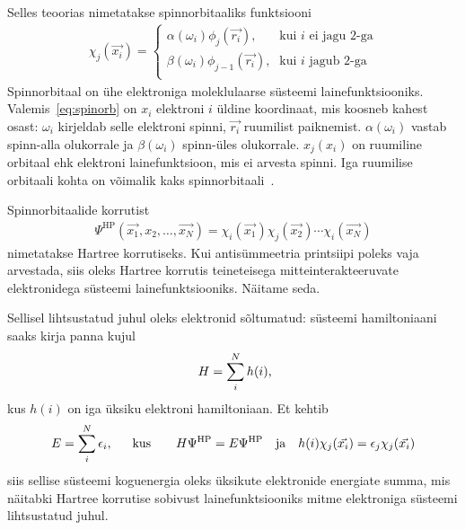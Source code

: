 \documentclass[12pt]{report}
\begin{document}
Selles teoorias nimetatakse spinnorbitaaliks funktsiooni
\begin{align}\label{eq:spinorb}
    \chi_j(\vec{x_i}) = \begin{cases}
        \alpha(\omega_i) \phi_j(\vec{r_i})\text{,} & \text{kui \(i\) ei jagu \(2\)-ga} \\
        \beta(\omega_i) \phi_{j-1}(\vec{r_i})\text{,} & \text{kui \(i\) jagub \(2\)-ga} \\
    \end{cases}
\end{align}
Spinnorbitaal on ühe elektroniga moleklulaarse süsteemi lainefunktsiooniks.
Valemis~\eqref{eq:spinorb} on \(x_i\) elektroni \(i\) üldine koordinaat, mis koosneb kahest osast: \(\omega_i\) kirjeldab selle elektroni spinni, \(\vec{r_i}\) ruumilist paiknemist.
\(\alpha(\omega_i)\) vastab spinn-alla olukorrale ja \(\beta(\omega_i)\) spinn-üles olukorrale.
\(x_j(x_i)\) on ruumiline orbitaal ehk elektroni lainefunktsioon, mis ei arvesta spinni.
Iga ruumilise orbitaali kohta on võimalik kaks spinnorbitaali~\cite{szabo+ostlund}.

Spinnorbitaalide korrutist
\begin{align}\label{eq:hp}
    \Psi^\text{HP}(\vec{x_1}, x_2, \ldots, \vec{x_N})
    = \chi_i(\vec{x_1}) \chi_j(\vec{x_2}) \cdots \chi_i(\vec{x_N})
\end{align}
nimetatakse Hartree korrutiseks.
Kui antisümmeetria printsiipi poleks vaja arvestada, siis oleks Hartree korrutis teineteisega mitteinterakteeruvate elektronidega süsteemi lainefunktsiooniks.
Näitame seda.

Sellisel lihtsustatud juhul oleks elektronid sõltumatud: süsteemi hamiltoniaani saaks kirja panna kujul
\begin{align}
    H = \sum_i^N h(i) \rlap{,}
\end{align}
kus \(h(i)\) on iga üksiku elektroni hamiltoniaan.
Et kehtib
\begin{align}
    E = \sum_i^N \epsilon_i \rlap{,}
    \qquad \text{kus} \qquad
    H \Psi^\text{HP} = E \Psi^\text{HP}
    \quad \text{ja} \quad
    h(i) \chi_j(\vec{x_i}) = \epsilon_j \chi_j(\vec{x_i})
\end{align}
siis sellise süsteemi koguenergia oleks üksikute elektronide energiate summa, mis näitabki Hartree korrutise sobivust lainefunktsiooniks mitme elektroniga süsteemi lihtsustatud juhul.
\end{document}
